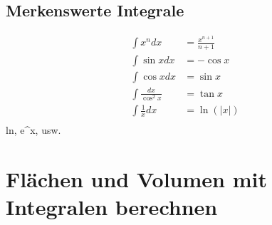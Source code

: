 \subsection{Merkenswerte Integrale}
\begin{align*}
  \int x^n dx&=\frac{x^{n+1}}{n+1}\\
  \int\sin x dx&= -\cos x\\
  \int\cos x dx&= \sin x\\
  \int\frac{ dx}{\cos^2x}&= \tan x\\
  \int\frac{1}{x} dx&= \ln(|x|)\\
\end{align*}
ln, e^x, usw.

\section{Flächen und Volumen mit Integralen berechnen}
